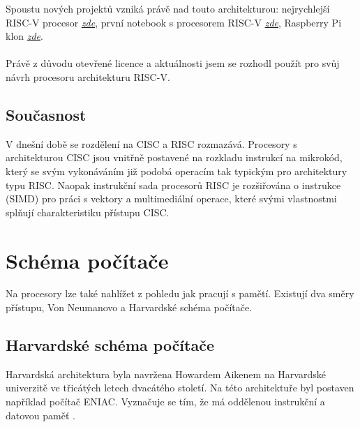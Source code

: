 \documentclass[FM,BP]{tulthesis}
\begin{document}
Spoustu nových projektů vzniká právě nad touto architekturou:
nejrychlejší RISC-V procesor
\href{https://www.cnews.cz/zatim-nejrychlejsi-procesor-risc-v-na-svete-vyrabi-ho-intel-na-4nm-procesu-umi-pcie-5-0-i-ddr5/}{\emph{zde}}, první notebook s procesorem RISC-V
\href{https://www.tomshardware.com/news/risc-v-laptop-world-first}{\emph{zde}},
Raspberry Pi klon
\href{https://www.czc.cz/radxa-rock-4-se-4gb/359880/produkt?gclid=Cj0KCQiAi8KfBhCuARIsADp-A54p9OKqDmKCbrRN9vUVP0A1xcUF1QDlwx-Gjsei9Vh2oUKDrGFNSIcaAoffEALw_wcB}{\emph{zde}}.

\paragraph{}
Právě z důvodu otevřené licence a aktuálnosti jsem se rozhodl použít pro svůj návrh procesoru architekturu RISC-V.

\subsection{Současnost}
V dnešní době se rozdělení na CISC a RISC rozmazává. Procesory s architekturou CISC jsou vnitřně postavené na rozkladu instrukcí na mikrokód, který se svým vykonáváním již podobá operacím tak typickým pro architektury typu RISC.
Naopak instrukční sada procesorů RISC je rozšiřována o instrukce (SIMD) pro práci s vektory a multimediální operace, které svými vlastnostmi splňují charakteristiku přístupu CISC. 

\newpage
\section{Schéma počítače}
Na procesory lze také nahlížet z pohledu jak pracují s pamětí. Existují dva směry přístupu, Von Neumanovo a Harvardské schéma počítače. 

\subsection{Harvardské schéma počítače} \label{kap:Harvardské schéma počítače}
Harvardská architektura byla navržena Howardem Aikenem na Harvardské univerzitě ve třicátých letech dvacátého století. Na této architektuře byl postaven například počítač ENIAC. Vyznačuje se tím, že má oddělenou instrukční a datovou paměť \cite{Kuty2014}. 
\end{document}
